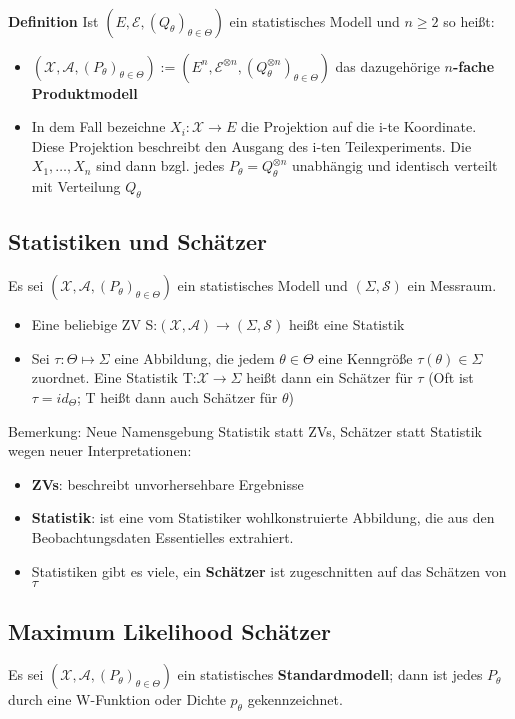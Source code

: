 \documentclass[a4paper,11pt]{scrartcl}
\begin{document}
\textbf{\\Definition}
Ist $(E,\mathcal{E},(Q_\theta)_{\theta \in \Theta})$ ein statistisches Modell und $ n \geq 2$ so heißt: 
\begin{itemize}
    \item $(\mathcal{X},\mathcal{A}, (P_\theta)_{\theta \in \Theta }) := (E^n,\mathcal{E}^{\otimes n},(Q_\theta^{\otimes n})_{\theta \in \Theta})$ das dazugehörige \textbf{$n$-fache Produktmodell}
    \item In dem Fall bezeichne $X_i: \mathcal{X} \rightarrow E$ die Projektion auf die i-te Koordinate. Diese Projektion beschreibt den Ausgang des i-ten Teilexperiments. Die $X_1, \dots, X_n$ sind dann bzgl. jedes $P_\theta = Q_\theta^{\otimes n}$ unabhängig und identisch verteilt mit Verteilung $Q_\theta$
\end{itemize}

\subsection{Statistiken und Schätzer}
Es sei $(\mathcal{X},\mathcal{A}, (P_\theta)_{\theta \in \Theta })$ ein statistisches Modell und $(\Sigma, \mathcal{S})$ ein Messraum.
\begin{itemize}
    \item Eine beliebige ZV S:$(\mathcal{X},\mathcal{A}) \rightarrow (\Sigma, \mathcal{S})$ heißt eine Statistik 
    \item Sei $\tau:  \Theta \mapsto \Sigma$ eine Abbildung, die jedem $\theta \in \Theta$ eine Kenngröße $\tau(\theta) \in \Sigma$ zuordnet.
    Eine Statistik T:$\mathcal{X} \rightarrow \Sigma$ heißt dann ein Schätzer für $\tau$ (Oft ist $\tau = id_\Theta$; T heißt dann auch Schätzer für $\theta$)
\end{itemize}
Bemerkung: Neue Namensgebung Statistik statt ZVs, Schätzer statt Statistik wegen neuer Interpretationen: 
\begin{itemize}
    \item \textbf{ZVs}: beschreibt unvorhersehbare Ergebnisse
    \item \textbf{Statistik}: ist eine vom Statistiker wohlkonstruierte Abbildung, die aus den Beobachtungsdaten Essentielles extrahiert.
    \item Statistiken gibt es viele, ein \textbf{Schätzer} ist zugeschnitten auf das Schätzen von $\tau$
\end{itemize}

\subsection{Maximum Likelihood Schätzer}
Es sei $(\mathcal{X},\mathcal{A}, (P_\theta)_{\theta \in \Theta })$ ein statistisches \textbf{Standardmodell}; dann ist jedes $P_\theta$ durch eine W-Funktion oder Dichte $p_\theta$ gekennzeichnet.
\end{document}
